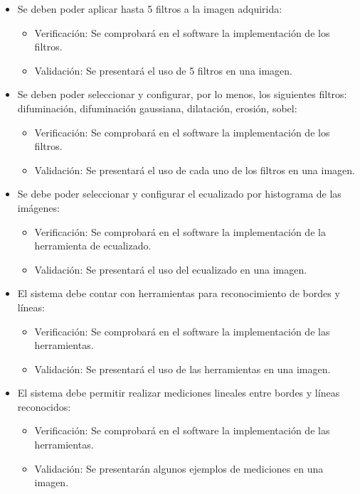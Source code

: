 \documentclass[
11pt, %
codirector, %
]{charter}
\begin{document}
\begin{itemize}
	\item \REQ Se deben poder aplicar hasta 5 filtros a la imagen adquirida:
	\begin{itemize}
		\item Verificación: Se comprobará en el software la implementación de los filtros.
		\item Validación: Se presentará el uso de 5 filtros en una imagen.
	\end{itemize}
	
	\item \REQ Se deben poder seleccionar y configurar, por lo menos, los siguientes filtros: difuminación, difuminación gaussiana, dilatación, erosión, sobel:
	\begin{itemize}
		\item Verificación: Se comprobará en el software la implementación de los filtros.
		\item Validación: Se presentará el uso de cada uno de los filtros en una imagen.
	\end{itemize}	
	
	\item \REQ Se debe poder seleccionar y configurar el ecualizado por histograma de las imágenes:
	\begin{itemize}
		\item Verificación: Se comprobará en el software la implementación de la herramienta de ecualizado.
		\item Validación: Se presentará el uso del ecualizado en una imagen.
	\end{itemize}
	
	\item \REQ El sistema debe contar con herramientas para reconocimiento de bordes y líneas:
	\begin{itemize}
		\item Verificación: Se comprobará en el software la implementación de las herramientas.
		\item Validación: Se presentará el uso de las herramientas en una imagen.
	\end{itemize}
	
	\item \REQ El sistema debe permitir realizar mediciones lineales entre bordes y líneas reconocidos:
	\begin{itemize}
		\item Verificación: Se comprobará en el software la implementación de las herramientas.
		\item Validación: Se presentarán algunos ejemplos de mediciones en una imagen.
	\end{itemize}
	

\end{itemize}
\end{document}
